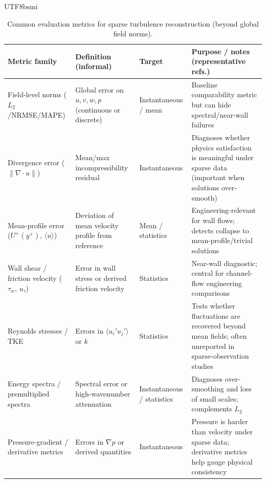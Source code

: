 \documentclass[master]{NTHUthesis}
\begin{document}
\begin{CJK*}{UTF8}{bsmi}
\begin{table}[!htbp]
    \centering
    \caption{Common evaluation metrics for sparse turbulence reconstruction (beyond global field norms).}
    \label{tab:recon_metrics}
    \footnotesize
    \begin{tabularx}{\textwidth}{
        >{\raggedright\arraybackslash}p{3.1cm}
        >{\raggedright\arraybackslash}p{4.2cm}
        >{\raggedright\arraybackslash}p{2.6cm}
        X
    }
    \toprule
    \textbf{Metric family} & \textbf{Definition (informal)} & \textbf{Target} & \textbf{Purpose / notes (representative refs.)} \\
    \midrule
    Field-level norms ($L_2$/NRMSE/MAPE) & Global error on $u,v,w,p$ (continuous or discrete) & Instantaneous / mean & Baseline comparability metric but can hide spectral/near-wall failures~\cite{shin2025robust, 10.1063/5.0180770} \\
    Divergence error ($\|\nabla\!\cdot\!u\|$) & Mean/max incompressibility residual & Instantaneous & Diagnoses whether physics satisfaction is meaningful under sparse data (important when solutions over-smooth) \\
    Mean-profile error ($U^+(y^+)$, $\langle u\rangle$) & Deviation of mean velocity profile from reference & Mean / statistics & Engineering-relevant for wall flows; detects collapse to mean-profile/trivial solutions \\
    Wall shear / friction velocity ($\tau_w$, $u_\tau$) & Error in wall stress or derived friction velocity & Statistics & Near-wall diagnostic; central for channel-flow engineering comparisons \\
    Reynolds stresses / TKE & Errors in $\langle u_i' u_j'\rangle$ or $k$ & Statistics & Tests whether fluctuations are recovered beyond mean fields; often unreported in sparse-observation studies \\
    Energy spectra / premultiplied spectra & Spectral error or high-wavenumber attenuation & Instantaneous / statistics & Diagnoses over-smoothing and loss of small scales; complements $L_2$~\cite{wang2025simulatingthreedimensionalturbulencephysicsinformed} \\
    Pressure-gradient / derivative metrics & Errors in $\nabla p$ or derived quantities & Instantaneous & Pressure is harder than velocity under sparse data; derivative metrics help gauge physical consistency~\cite{parfenyev20242dturbulence} \\
    \bottomrule
    \end{tabularx}
\end{table}
\FloatBarrier


\end{CJK*}
\end{document}
